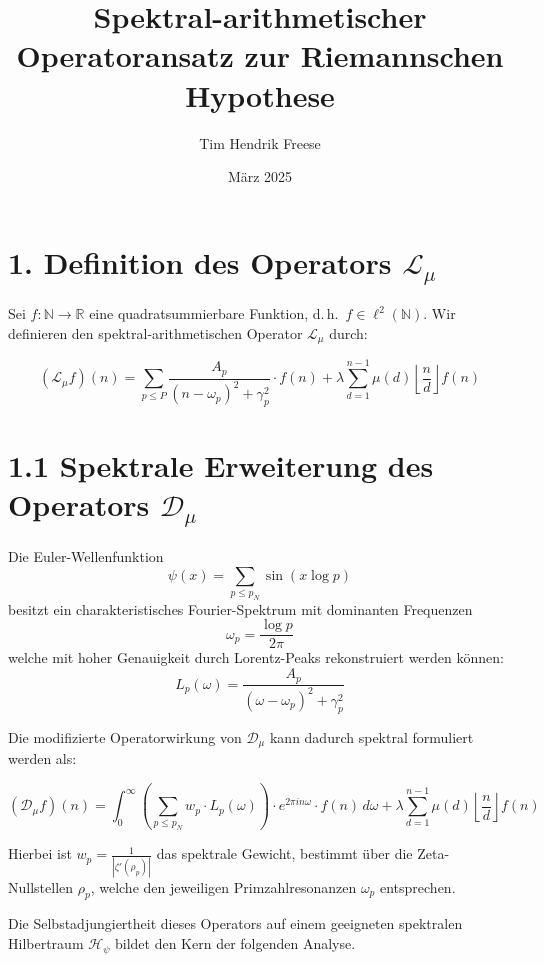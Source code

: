 \documentclass[12pt]{article}
\title{\textbf{Spektral-arithmetischer Operatoransatz zur Riemannschen Hypothese}}
\author{Tim Hendrik Freese}
\date{März 2025}
\begin{document}
\maketitle

\section*{1. Definition des Operators \boldmath$\mathcal{L}_\mu$}

Sei \( f: \mathbb{N} \to \mathbb{R} \) eine quadratsummierbare Funktion, d.\,h.\ \( f \in \ell^2(\mathbb{N}) \). Wir definieren den spektral-arithmetischen Operator \(\mathcal{L}_\mu\) durch:

\begin{equation}
(\mathcal{L}_\mu f)(n) = \sum_{p \leq P} \frac{A_p}{(n - \omega_p)^2 + \gamma_p^2} \cdot f(n) + \lambda \sum_{d=1}^{n-1} \mu(d) \left\lfloor \frac{n}{d} \right\rfloor f(n)
\end{equation}

  \section*{1.1 Spektrale Erweiterung des Operators \boldmath$\mathcal{D}_\mu$}

Die Euler-Wellenfunktion
\[
\psi(x) = \sum_{p \leq p_N} \sin(x \log p)
\]
besitzt ein charakteristisches Fourier-Spektrum mit dominanten Frequenzen
\[
\omega_p = \frac{\log p}{2\pi}
\]
welche mit hoher Genauigkeit durch Lorentz-Peaks rekonstruiert werden können:
\[
L_p(\omega) = \frac{A_p}{(\omega - \omega_p)^2 + \gamma_p^2}
\]

Die modifizierte Operatorwirkung von \(\mathcal{D}_\mu\) kann dadurch spektral formuliert werden als:

\[
(\mathcal{D}_\mu f)(n) =
\int_0^\infty \left( \sum_{p \leq p_N} w_p \cdot L_p(\omega) \right) \cdot e^{2\pi i n \omega} \cdot f(n) \, d\omega
+ \lambda \sum_{d=1}^{n-1} \mu(d) \left\lfloor \frac{n}{d} \right\rfloor f(n)
\]

Hierbei ist \(w_p = \frac{1}{|\zeta'(\rho_p)|}\) das spektrale Gewicht, bestimmt über die Zeta-Nullstellen \(\rho_p\), welche den jeweiligen Primzahlresonanzen \(\omega_p\) entsprechen.

Die Selbstadjungiertheit dieses Operators auf einem geeigneten spektralen Hilbertraum \(\mathcal{H}_\psi\) bildet den Kern der folgenden Analyse.


\bigskip
\end{document}
